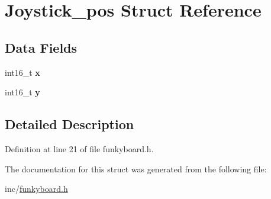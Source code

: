 \hypertarget{structJoystick__pos}{}\section{Joystick\+\_\+pos Struct Reference}
\label{structJoystick__pos}
\subsection*{Data Fields}
\begin{DoxyCompactItemize}
\item 
\mbox{\label{structJoystick__pos_af585c09865b0472bb4b445fd84c07884}} 
int16\+\_\+t {\bfseries x}
\item 
\mbox{\label{structJoystick__pos_a94eb3d57f6f2a2d2c694be1a6804dbb2}} 
int16\+\_\+t {\bfseries y}
\end{DoxyCompactItemize}


\subsection{Detailed Description}


Definition at line 21 of file funkyboard.\+h.



The documentation for this struct was generated from the following file\+:\begin{DoxyCompactItemize}
\item 
inc/\hyperlink{funkyboard_8h}{funkyboard.\+h}\end{DoxyCompactItemize}
